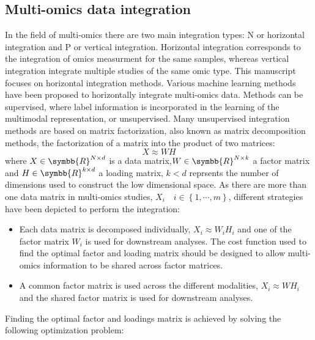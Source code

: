 \documentclass[../main.tex]{subfiles}
\begin{document}


	\subsection{Multi-omics data integration}
		In the field of multi-omics there are two main integration types: N or horizontal integration and P or vertical integration.
		Horizontal integration corresponds to the integration of omics measurment for the same samples, whereas vertical integration integrate multiple studies of the same omic type.
		This manuscript focuses on horizontal integration methods.
		Various machine learning methods have been proposed to horizontally integrate multi-omics data.
		Methods can be supervised, where label information is incorporated in the learning of the multimodal representation, or unsupervised.
		Many unsupervised integration methods are based on matrix factorization, also known as matrix decomposition methods, the factorization of a matrix into the product of two matrices:
		\begin{equation}
			X \approx WH
		\end{equation}
		where \(X \in \symbb{R}^{N\times d}\) is a data matrix,\(W \in \symbb{R}^{N\times k}\) a factor matrix and \(H \in \symbb{R}^{k\times d}\) a loading matrix, \(k < d\) reprsents the number of dimensions used to construct the low dimensional space.
		As there are more than one data matrix in multi-omics studies, \(X_i\quad i \in \left\{1, \cdots, m\right\}\), different strategies have been depicted to perform the integration:
		\begin{itemize}[nosep]
			\item Each data matrix is decomposed individually, \(X_i \approx W_iH_i\) and one of the factor matrix \(W_i\) is used for downstream analyses. The cost function used to find the optimal factor and loading matrix should be designed to allow multi-omics information to be shared across factor matrices.
			\item A common factor matrix is used across the different modalities, \(X_i \approx WH_i\) and the shared factor matrix is used for downstream analyses.
		\end{itemize}
		Finding the optimal factor and loadings matrix is achieved by solving the following optimization problem:
\end{document}
